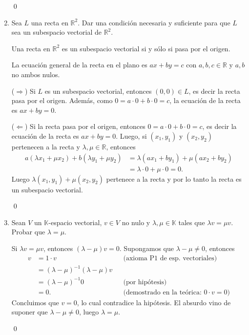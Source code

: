 \begin{enumerate}[resume, topsep=6pt, itemsep=.4cm]
    \qed     
    
    
    \item\label{rectas} Sea $L$ una recta en $\mathbb{R}^2$. Dar una condición necesaria y suficiente para que $L$ sea un subespacio vectorial de $\mathbb{R}^2$.
    
    
    \rta Una recta en $\mathbb{R}^2$ es un subespacio vectorial si y sólo si pasa por el origen. 
    
    La ecuación general de la recta en el plano es $ax+by=c$ con $a,b,c\in\mathbb{R}$ y $a,b$ no ambos nulos.

    ($\Rightarrow$) Si $L$ es un subespacio vectorial, entonces $(0,0) \in L$,  es decir la recta pasa por el origen. Además, como  $0 = a\cdot 0 + b \cdot 0= c$, la ecuación de la recta es  $ax+by=0$.

    ($\Leftarrow$) Si la recta pasa por el origen, entonces $0 = a\cdot 0 + b \cdot 0= c$, es decir la ecuación de la recta es  $ax+by=0$. Luego, si $(x_1,y_1)$ y $(x_2,y_2)$ pertenecen a la recta y $\lambda,\mu\in\mathbb{R}$, entonces
    \begin{align*}
        a(\lambda x_1+\mu x_2)+b(\lambda y_1+\mu y_2)&=\lambda(ax_1+by_1)+\mu(ax_2+by_2)\\
        &=\lambda\cdot 0+\mu\cdot 0=0.
    \end{align*}
    Luego $\lambda(x_1,y_1)+\mu(x_2,y_2)$ pertenece a la recta y por lo tanto la recta es un subespacio vectorial.

    \qed     
    
    \item Sean $V$ un $\mathbb{K}$-espacio vectorial, $v\in V$ no nulo y $\lambda,\mu\in\mathbb{K}$ tales que $\lambda v=\mu v$. Probar que $\lambda=\mu$.
    
    
    \rta Si $\lambda v=\mu v$, entonces $(\lambda-\mu)v=0$. Supongamos que $\lambda-\mu\neq 0$, entonces
    \begin{align*}
        v&= 1 \cdot v &&\text{(axioma P1 de esp. vectoriales)}\\
        &=(\lambda-\mu)^{-1}(\lambda-\mu)v&&\\
        &=(\lambda-\mu)^{-1}0&&\text{(por hipótesis)}\\
        &=0.&&\text{(demostrado en la teórica: $0\cdot v = 0$)}
    \end{align*}
    Concluimos que $v=0$, lo cual contradice la hipótesis. El absurdo vino de suponer que $\lambda-\mu\neq 0$, luego $\lambda=\mu$.

    \qed     
    

\end{enumerate}
